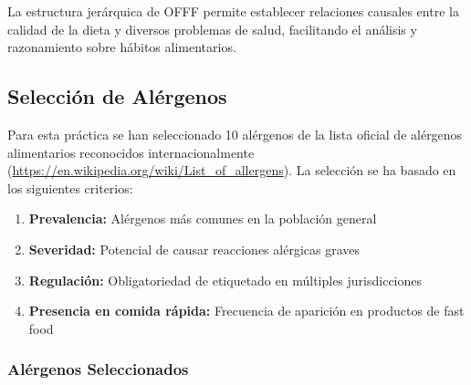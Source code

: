 \documentclass[12pt,a4paper]{article}
\begin{document}
La estructura jerárquica de OFFF permite establecer relaciones causales entre la calidad de la dieta y diversos problemas de salud, facilitando el análisis y razonamiento sobre hábitos alimentarios.

\subsection{Selección de Alérgenos}

Para esta práctica se han seleccionado 10 alérgenos de la lista oficial de alérgenos alimentarios reconocidos internacionalmente (\url{https://en.wikipedia.org/wiki/List_of_allergens}). La selección se ha basado en los siguientes criterios:

\begin{enumerate}
    \item \textbf{Prevalencia:} Alérgenos más comunes en la población general
    \item \textbf{Severidad:} Potencial de causar reacciones alérgicas graves
    \item \textbf{Regulación:} Obligatoriedad de etiquetado en múltiples jurisdicciones
    \item \textbf{Presencia en comida rápida:} Frecuencia de aparición en productos de fast food
\end{enumerate}

\subsubsection{Alérgenos Seleccionados}
\end{document}
